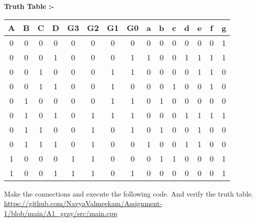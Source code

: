\documentclass{article}
\begin{document}
\begin{multicols}{2}
\begin{center}
\begin{tableofcontents}
\newpage
\textbf{Truth Table :-}
\vspace{5MM}
\begin{tabular}{|c|c|c|c|c|c|c|c|c|c|c|c|c|c|c|}
\hline
\textbf{A} & {B} & {C} & {D} & {G3} & {G2} & {G1} & {G0} & {a} & {b} & {c} & {d} & {e} & {f} & {g} \\
\hline
0 & 0 & 0 & 0 & 0 & 0 & 0 & 0 & 0 & 0 & 0 & 0 & 0 & 0 & 1 \\
\hline
0 & 0 & 0 & 1 & 0 & 0 & 0 & 1 & 1 & 0 & 0 & 1 & 1 & 1 & 1 \\
\hline
0 & 0 & 1 & 0 & 0 & 0 & 1 & 1 & 0 & 0 & 0 & 0 & 1 & 1 & 0 \\
\hline
0 & 0 & 1 & 1 & 0 & 0 & 1 & 0 & 0 & 0 & 1 & 0 & 0 & 1 & 0 \\
\hline
0 & 1 & 0 & 0 & 0 & 0 & 1 & 1 & 0 & 1 & 0 & 0 & 0 & 0 & 0 \\
\hline
0 & 1 & 0 & 1 & 0 & 1 & 1 & 1 & 0 & 0 & 0 & 1 & 1 & 1 & 1 \\
\hline
0 & 1 & 1 & 0 & 0 & 1 & 0 & 1 & 0 & 1 & 0 & 0 & 1 & 0 & 0 \\
\hline 
0 & 1 & 1 & 1 & 0 & 1 & 0 & 0 & 1 & 0 & 0 & 1 & 1 & 0 & 0 \\
\hline
1 & 0 & 0 & 0 & 1 & 1 & 0 & 0 & 0 & 1 & 1 & 0 & 0 & 0 & 1 \\
\hline
1 & 0 & 0 & 1 & 1 & 1 & 0 & 1 & 0 & 0 & 0 & 0 & 0 & 0 & 1 \\
\hline
\end{tabular}

\end{tableofcontents}
\end{center}
Make the connections and execute the following code. And verify the truth table. 
\newline
\newline
\href{https://github.com/NavyaValmeekam/Assignment-1/blob/main/A1_gray/src/main.cpp}{https://github.com/NavyaValmeekam/Assignment-1/blob/main/A1_gray/src/main.cpp}
\maketitle
\newpage
\bigskip
\renewcommand{\thefigure}{\theenumi}
\renewcommand{\thetable}{\theenumi}
%
%



\end{multicols}
\end{document}
